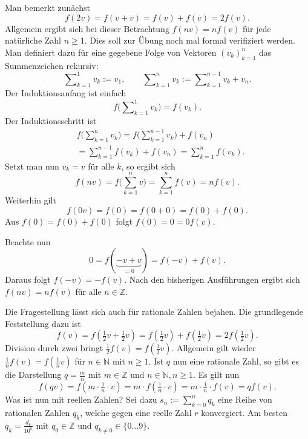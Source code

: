 \documentclass[a4paper,11pt,fleqn,twoside]{scrartcl}
\numberwithin{equation}{section}
\newcommand{\N}{\mathbb N}
\newcommand{\Z}{\mathbb Z}
\begin{document}
Man bemerkt zunächst
\begin{equation}
f(2v) = f(v+v) = f(v)+f(v) = 2f(v).
\end{equation}
Allgemein ergibt sich bei dieser Betrachtung $f(nv) = nf(v)$ für jede
natürliche Zahl $n\ge 1$. Dies soll zur Übung noch mal formal
verifiziert werden. Man definiert dazu für eine gegebene Folge
von Vektoren $(v_k)_{k=1}^n$ das Summenzeichen rekursiv:
\begin{equation}
\sum\nolimits_{k=1}^1 v_k := v_1,\qquad
\sum\nolimits_{k=1}^n v_k := \sum\nolimits_{k=1}^{n-1} v_k+v_n.
\end{equation}
Der Induktionsanfang ist einfach
\begin{equation}
f\Big(\sum\nolimits_{k=1}^1 v_k\Big) = f(v_k).
\end{equation}
Der Induktionsschritt ist
\begin{equation}
\begin{split}
&f\Big(\sum\nolimits_{k=1}^n v_k\Big)
= f\Big(\sum\nolimits_{k=1}^{n-1} v_k\Big)+f(v_n)\\
&=\sum\nolimits_{k=1}^{n-1} f(v_k)+f(v_n)
= \sum\nolimits_{k=1}^n f(v_k).
\end{split}
\end{equation}
Setzt man nun $v_k=v$ für alle $k$, so ergibt sich
\begin{equation}
f(nv) = f\bigg(\sum_{k=1}^n v\bigg) = \sum_{k=1}^n f(v) = nf(v).
\end{equation}
Weiterhin gilt
\begin{equation}
f(0v) = f(0) = f(0+0) = f(0) + f(0).
\end{equation}
Aus $f(0)=f(0)+f(0)$ folgt $f(0)=0=0f(v)$.

Beachte nun
\begin{equation}
0 = f(\underbrace{-v+v}_{=0}) = f(-v)+f(v).
\end{equation}
Daraus folgt $f(-v) = -f(v)$.
Nach den bisherigen Ausführungen ergibt sich $f(nv) = nf(v)$ für alle
$n\in\Z$.

Die Fragestellung lässt sich auch für rationale Zahlen bejahen.
Die grundlegende Feststellung dazu ist
\begin{equation}
f(v) = f(\tfrac{1}{2}v+\tfrac{1}{2}v) = f(\tfrac{1}{2}v) + f(\tfrac{1}{2}v)
= 2f(\tfrac{1}{2}v).
\end{equation}
Division durch zwei bringt $\tfrac{1}{2}f(v) = f(\tfrac{1}{2}v)$.
Allgemein gilt wieder $\frac{1}{n}f(v) = f(\tfrac{1}{n}v)$ für
$n\in\N$ mit $n\ge 1$. Ist $q$ nun eine rationale Zahl, so gibt
es die Darstellung $q=\frac{m}{n}$ mit $m\in\Z$ und $n\in\N, n\ge 1$.
Es gilt nun
\begin{equation}
f(qv) = f(m\cdot\tfrac{1}{n}\cdot v) = m\cdot f(\tfrac{1}{n}\cdot v)
= m\cdot\tfrac{1}{n}\cdot f(v) = qf(v).
\end{equation}
Was ist nun mit reellen Zahlen? Sei dazu $s_n:=\sum_{k=0}^n q_k$
eine Reihe von rationalen Zahlen $q_k$, welche gegen eine reelle
Zahl $r$ konvergiert. Am besten $q_k = \frac{d_k}{10^k}$ mit
$q_0\in\Z$ und $q_{k\ne 0}\in\{0\ldots 9\}$.
\end{document}
